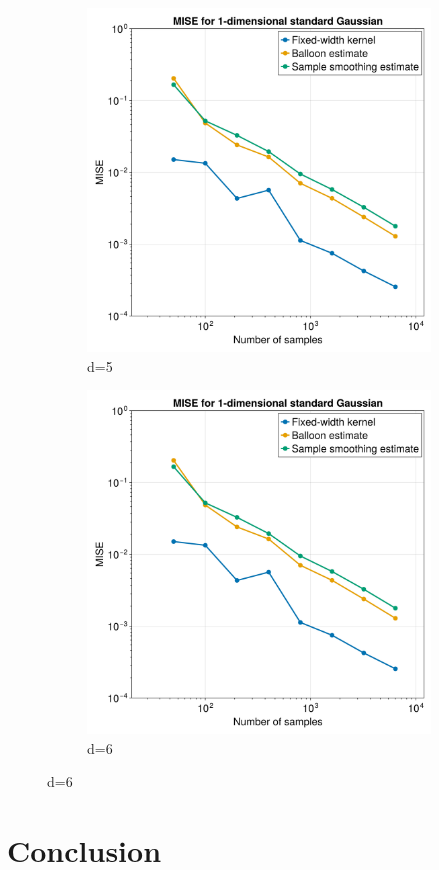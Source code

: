 \documentclass{article}
\begin{document}
\begin{figure}
\begin{subfigure}{.5\textwidth}
  \includegraphics[width=.8\linewidth]{images/MISE_d=1.png}
  \caption{d=5}
  \label{fig:sfig1}
\end{subfigure}%
\begin{subfigure}{.5\textwidth}
  \centering
  \includegraphics[width=.8\linewidth]{images/MISE_d=1.png}
  \caption{d=6}
  \label{fig:sfig2}
\end{subfigure}
\end{figure}

\section{Conclusion}

\printbibliography
\end{document}
